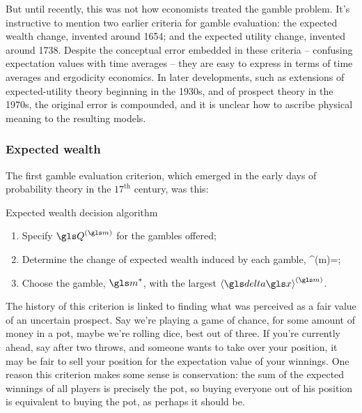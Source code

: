 But until recently, this was not how economists treated the gamble problem. It's instructive
to mention two earlier criteria for gamble evaluation: the expected wealth change, 
invented around 1654; and the expected utility change, invented around 1738. Despite the 
conceptual error embedded in these criteria -- confusing expectation values with time 
averages -- they are easy to express in terms of time averages and ergodicity economics. 
In later developments, such as extensions of expected-utility theory beginning in the 1930s, 
and of prospect theory in the 1970s, the original error is compounded, and it is unclear 
how to ascribe physical meaning to the resulting models.


%
\subsubsection{Expected wealth}
The first gamble evaluation criterion, which emerged in the early 
days of probability theory in the $17^\text{th}$ century, was this:

\begin{keypts}{Expected wealth decision algorithm}
\begin{enumerate}
\item Specify $\Q^{(\m)}$ for the gambles offered;
\item Determine the change of expected wealth induced by each gamble,
\be
\ave{\d\x}^{(m)}=;
\ee
\item Choose the gamble, $\m^*$, with the largest $\ave{\d\x}^{(\m)}$.
\end{enumerate}
\end{keypts}

The history of this criterion is linked to finding what was perceived as a fair value
of an uncertain prospect. Say we're playing a game of chance, for some amount of 
money in a pot, maybe we're rolling dice, best out of three. If you're currently ahead, 
say after two throws, and someone wants to take over your 
position, it may be fair to sell your position for the expectation value of your 
winnings. One reason this criterion makes some sense is conservation: the sum 
of the expected winnings of all players is precisely the pot, so buying everyone 
out of his position is equivalent to buying the pot, as perhaps it should be.

